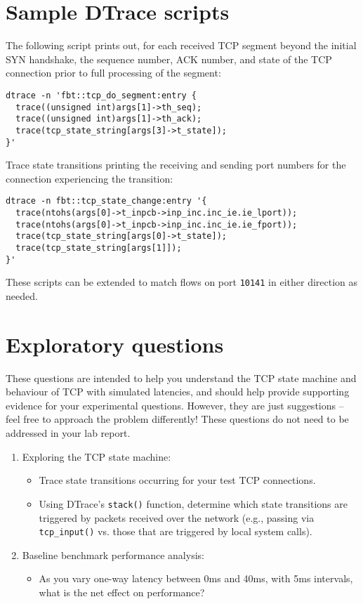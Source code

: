 \documentclass[a4paper,10pt]{article}
\begin{document}
\section*{Sample DTrace scripts}

The following script prints out, for each received TCP segment beyond the
initial SYN handshake, the sequence number, ACK number, and state of the TCP
connection prior to full processing of the segment:

\begin{verbatim}
dtrace -n 'fbt::tcp_do_segment:entry {
  trace((unsigned int)args[1]->th_seq);
  trace((unsigned int)args[1]->th_ack);
  trace(tcp_state_string[args[3]->t_state]);
}'
\end{verbatim}

\noindent
Trace state transitions printing the receiving and sending port numbers for
the connection experiencing the transition:

\begin{verbatim}
dtrace -n fbt::tcp_state_change:entry '{
  trace(ntohs(args[0]->t_inpcb->inp_inc.inc_ie.ie_lport));
  trace(ntohs(args[0]->t_inpcb->inp_inc.inc_ie.ie_fport));
  trace(tcp_state_string[args[0]->t_state]);
  trace(tcp_state_string[args[1]]);
}'
\end{verbatim}

\noindent
These scripts can be extended to match flows on port \texttt{10141} in either
direction as needed.

\section*{Exploratory questions}

These questions are intended to help you understand the TCP state machine and
behaviour of TCP with simulated latencies, and should help provide supporting
evidence for your experimental questions.
However, they are just suggestions -- feel free to approach the problem
differently!
These questions do not need to be addressed in your lab report.

\begin{enumerate}
  \item Exploring the TCP state machine:
  \begin{itemize}
    \item Trace state transitions occurring for your test TCP connections.
    \item Using DTrace's \texttt{stack()} function, determine which state
      transitions are triggered by packets received over the network (e.g.,
      passing via \texttt{tcp\_input()} vs. those that are triggered by local
      system calls).
  \end{itemize}
  \item Baseline benchmark performance analysis:
  \begin{itemize}
    \item As you vary one-way latency between 0ms and 40ms, with 5ms
      intervals, what is the net effect on performance?
  \end{itemize}
\end{enumerate}
\end{document}
